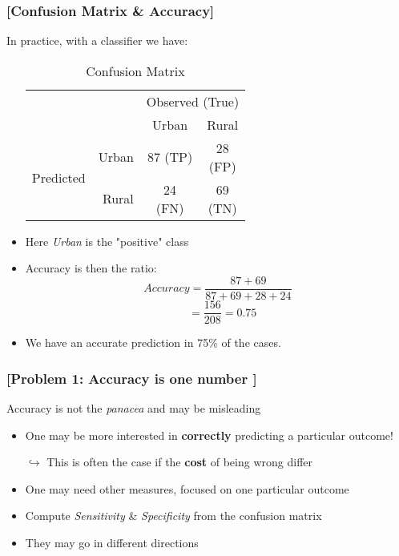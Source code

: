 \documentclass[xcolor=x11names,compress, aspectratio=169]{beamer}
\renewcommand{\(}{\begin{columns}}
\renewcommand{\)}{\end{columns}}
\newcommand{\<}[1]{\begin{column}{#1}}
\renewcommand{\>}{\end{column}}
\begin{document}
\begin{frame} %
\frametitle{\textcolor{brique}{[Confusion Matrix  \& Accuracy]}}
In practice, with a classifier we have:
\begin{itemize}[<+->]
  \item[]
    \begin{table}[]
    \begin{tabular}{l r|c|c|}

                              & & \multicolumn{2}{c|}{Observed (True)}                                                                                          \\
                              & &    Urban  &  Rural  \\  \hline
    \multirow{2}{*}{Predicted}& Urban & \shortstack[c]{$87$ \\ \tiny{(TP)}}& \shortstack[c]{28 \\ \tiny{(FP)}} \\ \cline{2-4}
                              & Rural &  \shortstack[c]{24 \\ \tiny{(FN)}}& \shortstack[c]{69 \\ \tiny{(TN)}} \\ \hline
    \end{tabular}
    \caption{Confusion Matrix}
    \end{table}
  \item Here \textit{Urban} is the "positive" class
  \item Accuracy is then the ratio:
   $$ Accuracy = \frac{87 + 69}{ 87 + 69 + 28 + 24} $$
   $$
 \; \; \;  =  \frac{156}{208} = 0.75
 $$
  \item  We have an accurate prediction in 75\% of the cases.
\end{itemize}
\end{frame}



\begin{frame} %
\frametitle{\textcolor{brique}{[Problem 1: Accuracy is one number ]}}
Accuracy is not the \textit{panacea} and may be misleading
\begin{itemize}[<+->]
    \item One may be more interested in \textbf{correctly} predicting a particular outcome!
    \item[$\hookrightarrow$] This is often the case if the \textbf{cost} of being wrong differ
    \item One may need other measures, focused on one particular outcome
    \item Compute \textit{Sensitivity}  \&  \textit{Specificity } from the confusion matrix
    \item They may go in different directions
\end{itemize}
\end{frame}
\end{document}
